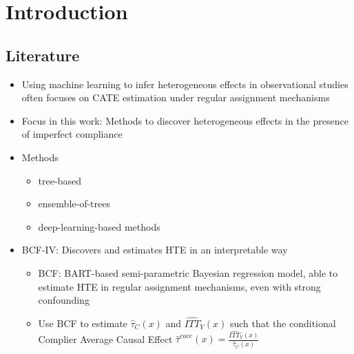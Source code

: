 \chapter{Introduction}

\cite{hahn_bayesian_2020} 

\section{Literature}


\begin{itemize}
    \item Using machine learning to infer heterogeneous effects in observational studies often focuses on CATE estimation under regular assignment mechanisms 
    \item Focus in this work: Methods to discover heterogeneous effects in the presence of imperfect compliance
    \item Methods
    \begin{itemize}
        \item tree-based 
        \item ensemble-of-trees 
        \item deep-learning-based methods 
    \end{itemize}
    \item BCF-IV: Discovers and estimates HTE in an interpretable way %
    \begin{itemize}
        \item BCF: BART-based semi-parametric Bayesian regression model, able to estimate HTE in regular assignment mechanisms, even with strong confounding %
        \item Use BCF to estimate $\hat\tau_C(x)$ and  $\widehat{ITT}_{Y}(x)$ such that the conditional Complier Average Causal Effect $\hat\tau^{cace}(x) = \frac{\widehat{ITT}_{Y}(x)}{\hat\tau_C(x)}$
    \end{itemize}
\end{itemize}



